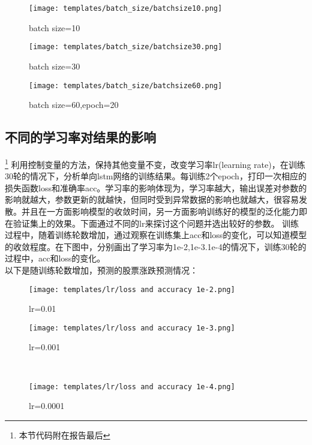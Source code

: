 \documentclass[addpoints,answers]{exam}
\begin{document}
  \begin{figure}[H]
    \centering
    \texttt{[image: templates/batch\_size/batchsize10.png]}
    \caption{batch size=10}
  \end{figure}

  \begin{figure}[H]
    \centering
    \texttt{[image: templates/batch\_size/batchsize30.png]}
    \caption{batch size=30}
  \end{figure}

  \begin{figure}[H]
    \centering
    \texttt{[image: templates/batch\_size/batchsize60.png]}
    \caption{batch size=60,epoch=20}
  \end{figure}

\subsection{不同的学习率对结果的影响}\footnote{本节代码附在报告最后}
 利用控制变量的方法，保持其他变量不变，改变学习率lr(learning rate)，在训练30轮的情况下，分析单向lstm网络的训练结果。每训练2个epoch，打印一次相应的损失函数loss和准确率acc。学习率的影响体现为，学习率越大，输出误差对参数的影响就越大，参数更新的就越快，但同时受到异常数据的影响也就越大，很容易发散。并且在一方面影响模型的收敛时间，另一方面影响训练好的模型的泛化能力即在验证集上的效果。下面通过不同的lr来探讨这个问题并选出较好的参数。
训练过程中，随着训练轮数增加，通过观察在训练集上acc和loss的变化，可以知道模型的收敛程度。在下图中，分别画出了学习率为1e-2,1e-3.1e-4的情况下，训练30轮的过程中，acc和loss的变化。
\\
以下是随训练轮数增加，预测的股票涨跌预测情况：
\begin{figure}[H]
\centering
\begin{minipage}[t]{0.48\textwidth}
\centering
\texttt{[image: templates/lr/loss and accuracy 1e-2.png]}
\caption{lr=0.01}
\end{minipage}
\begin{minipage}[t]{0.48\textwidth}
\centering
\texttt{[image: templates/lr/loss and accuracy 1e-3.png]}
\caption{lr=0.001}
\end{minipage}\\
\begin{minipage}[t]{0.48\textwidth}
\centering
\texttt{[image: templates/lr/loss and accuracy 1e-4.png]}
\caption{lr=0.0001}
\end{minipage}
\end{figure}
\end{document}
